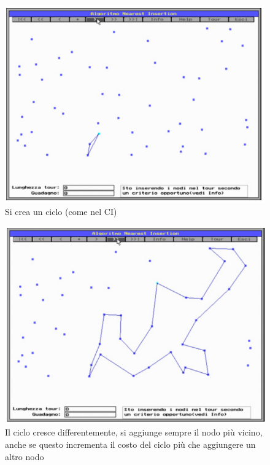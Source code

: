 \documentclass{article}
\begin{document}
    \begin{figure}[H]
        \centering
        \includegraphics[scale=0.5]{images/NI1.png}
        \caption{Si crea un ciclo (come nel CI)}
    \end{figure}

    \begin{figure}[H]
        \centering
        \includegraphics[scale=0.5]{images/NI2.png}
        \caption{Il ciclo cresce differentemente, si aggiunge sempre il nodo più vicino,
            anche se questo incrementa il costo del ciclo più che aggiungere un altro nodo}
    \end{figure}
\end{document}
